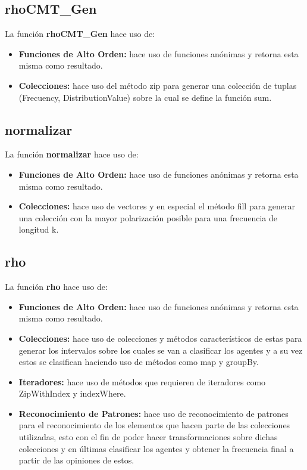 \documentclass{article}
\begin{document}
    \subsection{rhoCMT\_Gen}
        La función \textbf{rhoCMT\_Gen} hace uso de:

    \begin{itemize}
      \item \textbf{Funciones de Alto Orden:} hace uso de funciones anónimas y retorna esta misma como resultado.
      \item \textbf{Colecciones:} hace uso del método zip para generar una colección de tuplas (Frecuency, DistributionValue) sobre la cual se define la función sum.
    \end{itemize}

    \subsection{normalizar}
    La función \textbf{normalizar} hace uso de:

    \begin{itemize}
      \item \textbf{Funciones de Alto Orden:} hace uso de funciones anónimas y retorna esta misma como resultado.
      \item \textbf{Colecciones:} hace uso de vectores y en especial el método fill para generar una colección con la mayor polarización posible para una frecuencia de longitud k.
    \end{itemize}

    \subsection{rho}
    La función \textbf{rho} hace uso de:

    \begin{itemize}
      \item \textbf{Funciones de Alto Orden:} hace uso de funciones anónimas y retorna esta misma como resultado.
      \item \textbf{Colecciones:} hace uso de colecciones y métodos característicos de estas para generar los intervalos sobre los cuales se van a clasificar los agentes y a su vez estos se clasifican haciendo uso de métodos como map y groupBy.
      \item \textbf{Iteradores:} hace uso de métodos que requieren de iteradores como ZipWithIndex y indexWhere.
      \item \textbf{Reconocimiento de Patrones:} hace uso de reconocimiento de patrones para el reconocimiento de los elementos que hacen parte de las colecciones utilizadas, esto con el fin de poder hacer transformaciones sobre dichas colecciones y en últimas clasificar los agentes y obtener la frecuencia final a partir de las opiniones de estos.
    \end{itemize}
\end{document}
